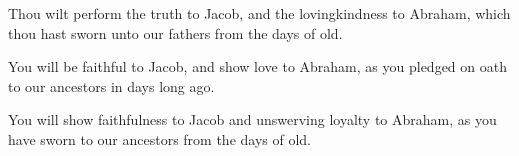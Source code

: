 			\begin{versebox}
					\item[BHS] 
					\item[LXX] 
					\item[ASV] Thou wilt perform the truth to Jacob, and the lovingkindness to Abraham, which thou hast sworn unto our fathers from the days of old.
					\item[NIV] You will be faithful to Jacob, and show love to Abraham, as you pledged on oath to our ancestors in days long ago.
					\item[NRSV] You will show faithfulness to Jacob and unswerving loyalty to Abraham, as you have sworn to our ancestors from the days of old.
			\end{versebox}
